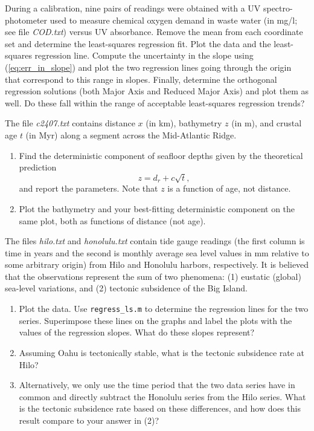 \begin{problem}
During a calibration, nine pairs of readings were obtained with a UV spectro-photometer used to measure chemical oxygen demand
in waste water (in mg/l; see file \emph{COD.txt}) versus UV absorbance.  Remove the mean from each coordinate set and
determine the least-squares regression fit.
Plot the data and the least-squares regression line.  Compute the
uncertainty in the slope using (\ref{eq:err_in_slope}) and plot the two regression lines going through the origin that
correspond to this range in slopes.  Finally, determine the orthogonal regression solutions (both Major Axis and Reduced Major Axis)
and plot them as well.  Do these fall within the
range of acceptable least-squares regression trends?
\end{problem}

\begin{problem}
	\setcounter{Conrad}{\theproblem}
	\setcounter{Conradchap}{\thechapter}
The file \emph{c2407.txt} contains distance $x$ (in km), bathymetry $z$ (in m), and crustal age $t$ (in Myr) along a
segment across the Mid-Atlantic Ridge.  
\begin{enumerate}[label=\alph*)]
\item	Find the deterministic component of seafloor depths given by the theoretical prediction
$$
z = d_r + c \sqrt{t},
$$ 
	and report the parameters.  Note that $z$ is a function of age, not distance.
\item	Plot the bathymetry and your best-fitting deterministic component on the same plot, both as functions of distance (not age).
\end{enumerate}
\end{problem}

\begin{problem}
\setcounter{RSL}{\theproblem}
The files \emph{hilo.txt} and \emph{honolulu.txt} contain tide gauge 
readings (the first column is time in years and the second is monthly average sea level values in mm relative to some
arbitrary origin) from Hilo and Honolulu harbors, respectively.  It is 
believed that the observations represent the sum of two phenomena: (1) eustatic (global) sea-level 
variations, and (2) tectonic subsidence of the Big Island.
\begin{enumerate}[label=\alph*)]
\item Plot the data.  Use \texttt{regress\_ls.m} to determine the regression lines for the two series.  Superimpose 
these lines on the graphs and label the plots with the values of the regression slopes.  What do 
these slopes represent?
\item Assuming Oahu is tectonically stable, what is the tectonic subsidence rate at Hilo?
\item Alternatively, we only use the time period that the two data series have in common and directly 
subtract the Honolulu series from the Hilo series.  What is the tectonic subsidence rate based on 
these differences, and how does this result compare to your answer in (2)?
\end{enumerate}
\end{problem}

